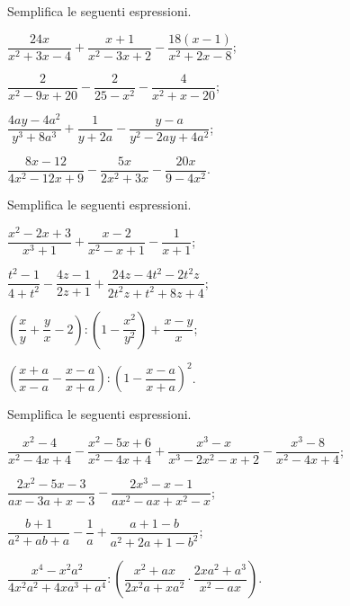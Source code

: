 \begin{esercizio}[\Ast]
\label{ese:14.36}
Semplifica le seguenti espressioni.
\begin{multicols}{2}
\begin{enumeratea}
 \item $\dfrac{24x}{x^{2}+3x-4}+\dfrac{x+1}{x^{2}-3x+2}-\dfrac{18(x-1)}{x^{2}+2x-8}$;
 \item $\dfrac{2}{x^{2}-9x+20}-\dfrac{2}{25-x^{2}}-\dfrac{4}{x^{2}+x-20}$;
 \item $\dfrac{4ay-4a^{2}}{y^{3}+8a^{3}}+\dfrac{1}{y+2a}-\dfrac{y-a}{y^{2}-2ay+4a^{2}}$;
 \item $\dfrac{8x-12}{4x^{2}-12x+9}-\dfrac{5x}{2x^{2}+3x}-\dfrac{20x}{9-4x^{2}}$.
\end{enumeratea}
\end{multicols}
\end{esercizio}

\begin{esercizio}[\Ast]
\label{ese:14.37}
Semplifica le seguenti espressioni.
\begin{multicols}{2}
\begin{enumeratea}
 \item $\dfrac{x^{{2}}-2x+3}{x^{{3}}+1}+\dfrac{x-2}{x^{{2}}-x+1}-\dfrac{1}{x+1}$;
 \item $\dfrac{t^{2}-1}{4+t^{2}}-\dfrac{4z-1}{2z+1}+\dfrac{24z-4t^{2}-2t^{2}z}{2t^{2}z+t^{2}+8z+4}$;
 \item $\left(\dfrac{x}{y}+\dfrac{y}{x}-2\right):\left(1-\dfrac{x^{2}}{y^{2}}\right)+\dfrac{x-y}{x}$;
 \item $\left(\dfrac{x+a}{x-a}-\dfrac{x-a}{x+a}\right):\left(1-\dfrac{x-a}{x+a}\right)^{2}$.
\end{enumeratea}
\end{multicols}
\end{esercizio}

\begin{esercizio}
\label{ese:14.38}
Semplifica le seguenti espressioni.
\begin{enumeratea}
 \item $\dfrac{x^{2}-4}{x^{2}-4x+4}-\dfrac{x^{2}-5x+6}{x^{2}-4x+4}+\dfrac{x^{3}-x}{x^{3}-2x^{2}-x+2}-\dfrac{x^{3}-8}{x^{2}-4x+4}$;
 \item $\dfrac{2x^{2}-5x-3}{ax-3a+x-3}-\dfrac{2x^{3}-x-1}{ax^{2}-ax+x^{2}-x}$;
 \item $\dfrac{b+1}{a^{2}+ab+a}-\dfrac{1}{a}+\dfrac{a+1-b}{a^{2}+2a+1-b^{2}}$;
 \item $\dfrac{x^{4}-x^{2}a^{2}}{4x^{2}a^{2}+4xa^{3}+a^{4}}:\left(\dfrac{x^{2}+ax}{2x^{2}a+xa^{2}}\cdot{\dfrac{2xa^{2}+a^{3}}{x^{2}-ax}}\right)$.
\end{enumeratea}
\end{esercizio}

